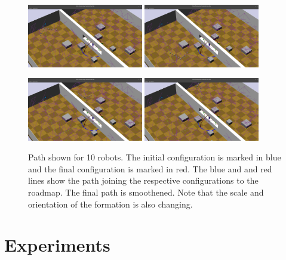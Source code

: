 \documentclass[12pt,a4paper, onecolumn]{IEEEtran}
\begin{document}
\begin{figure}[bpt]
  \centerline{\includegraphics[width=0.45\textwidth]{lPath_start.png} %
  \includegraphics[width=0.45\textwidth]{lPath_mid0.png}} \vspace{0.05in}
  \centerline{\includegraphics[width=0.45\textwidth]{lPath_mid.png} %
  \includegraphics[width=0.45\textwidth]{lPath_end.png}}
  \caption{Path shown for 10 robots. The initial configuration is marked in blue and the
  final configuration is marked in red. The blue and and red lines show the path joining
the respective configurations to the roadmap. The final path is smoothened. Note that the
scale and orientation of the formation is also changing.}
  \label{fig:ten}
\end{figure}
\section{Experiments}
\end{document}
